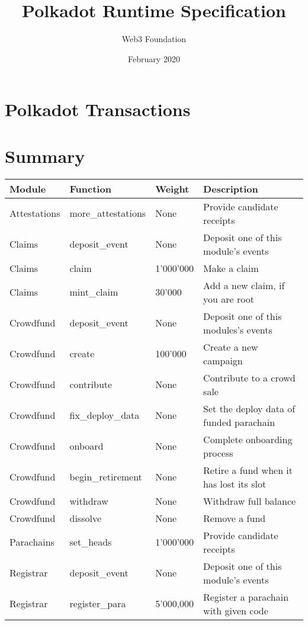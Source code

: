 \documentclass[11pt,a4paper]{article}
\begin{document}
\title{Polkadot Runtime Specification}
\author{Web3 Foundation}
\date{February 2020}
\maketitle
\section{Polkadot Transactions}

\section*{Summary}
\begin{center}
  \begin{tabulary}{1.0\textwidth}{LLLL}
    \textbf{Module} & \textbf{Function} & \textbf{Weight} & \textbf{Description} \\
    \hline
    Attestations & more\_attestations & None & Provide candidate receipts \\
    Claims & deposit\_event & None & Deposit one of this module's events \\
    Claims & claim & 1'000'000 & Make a claim \\
    Claims & mint\_claim & 30'000 & Add a new claim, if you are root \\
    Crowdfund & deposit\_event & None & Deposit one of this modules's events \\
    Crowdfund & create & 100'000 & Create a new campaign  \\
    Crowdfund & contribute & None & Contribute to a crowd sale \\
    Crowdfund & fix\_deploy\_data & None & Set the deploy data of funded parachain \\
    Crowdfund & onboard & None & Complete onboarding process \\
    Crowdfund & begin\_retirement & None & Retire a fund when it has lost its slot \\
    Crowdfund & withdraw & None & Withdraw full balance \\
    Crowdfund & dissolve & None & Remove a fund \\
    Parachains & set\_heads & 1'000'000 & Provide candidate receipts \\
    Registrar & deposit\_event & None & Deposit one of this module's events \\
    Registrar & register\_para & 5'000,000 & Register a parachain with given code \\

\end{tabulary}
\end{center}
\end{document}
